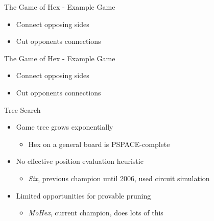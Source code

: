 \documentclass{beamer}
\begin{document}
\begin{frame}{The Game of Hex - Example Game}
	\begin{figure}[tb]
	\end{figure}
	\begin{itemize}
		\item Connect opposing sides
		\item Cut opponents connections
	\end{itemize}
\end{frame}

\begin{frame}{The Game of Hex - Example Game}
	\begin{figure}[tb]
	\end{figure}
	\begin{itemize}
		\item Connect opposing sides
		\item Cut opponents connections
	\end{itemize}
\end{frame}

\begin{frame}{Tree Search}
\begin{itemize}
	\item Game tree grows exponentially
	\begin{itemize}
		\item Hex on a general board is PSPACE-complete
	\end{itemize}
	\item No effective position evaluation heuristic
	\begin{itemize}
		\item \emph{Six}, previous champion until 2006, used circuit simulation
	\end{itemize}
	\item Limited opportunities for provable pruning
	\begin{itemize}
		\item \emph{MoHex}, current champion, does lots of this
	\end{itemize}
\end{itemize}
\end{frame}
\end{document}
